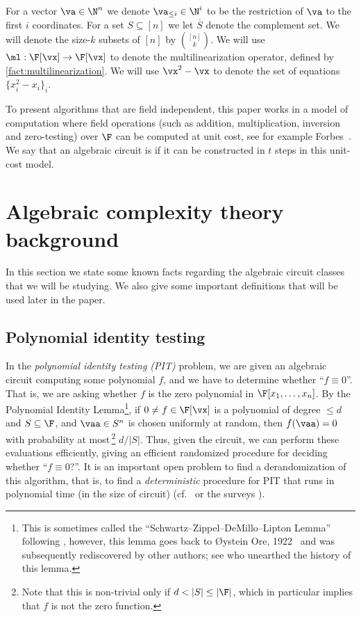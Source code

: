 \documentclass{toc}
\begin{document}
For a vector $\va\in\N^n$ we denote $\va_{\le i}\in\N^i$ to be the restriction of $\va$ to the first $i$ coordinates. For a set $S \subseteq [n]$ we let $\overline{S}$ denote the complement set.  We will denote the size-$k$ subsets of $[n]$ by $\binom{[n]}{k}$.  We will use $\ml:\F[\vx]\to\F[\vx]$ to denote the multilinearization operator, defined by \autoref{fact:multilinearization}.  We will use $\vx^2-\vx$ to denote the set of equations $\{x_i^2 -x_i\}_i$.

To present algorithms that are field independent, this paper works in a model of computation where field operations (such as addition, multiplication, inversion and zero-testing) over $\F$ can be computed at unit cost, see for example Forbes~\cite[Appendix A]{Forbes14}. We say that an algebraic circuit is  if it can be constructed in $t$ steps in this unit-cost model.

%
%
%
%

\section{Algebraic complexity theory background}\label{sec:background}

In this section we state some known facts regarding the algebraic circuit classes that we will be studying. We also give some important definitions that will be used later in the paper.

\subsection{Polynomial identity testing}\label{sec:PIT}

In the \emph{polynomial identity testing (PIT)} problem, we are given an algebraic circuit computing some polynomial $f$, and we have to determine whether ``$f\equiv 0$''.  That is, we are asking whether $f$ is the zero polynomial in $\F[x_1,\ldots,x_n]$. By the Polynomial Identity Lemma\footnote{This is sometimes called the ``Schwartz--Zippel--DeMillo--Lipton Lemma'' following \cite{Zippel79,Schwartz80,DeMilloLipton78}, however, this lemma goes back to {\O}ystein Ore, 1922~\cite{ore}
and was subsequently rediscovered
by other authors; see \cite{arvind} who unearthed the history of this lemma.}, if $0\ne f \in \F[\vx]$ is a polynomial of degree $\le d$ and $S\subseteq \F$, and $\vaa\in S^n$ is chosen uniformly at random, then $f(\vaa) =0$ with probability at most\,\footnote{Note that this is non-trivial only if $d < |S| \leq |\F|$, which in particular implies that $f$ is not the zero function.} $d/|S|$. Thus, given the circuit, we can perform these evaluations efficiently, giving an efficient randomized procedure for deciding whether ``$f\equiv 0$?''.  It is an important open problem to find a derandomization of this algorithm, that is, to find a \emph{deterministic} procedure for PIT that runs in polynomial time (in the size of circuit) (cf.~\cite[Chap.~4]{SY10} or the surveys \cite{DBLP:journals/eatcs/Saxena09,Saxena2014}).
\end{document}
